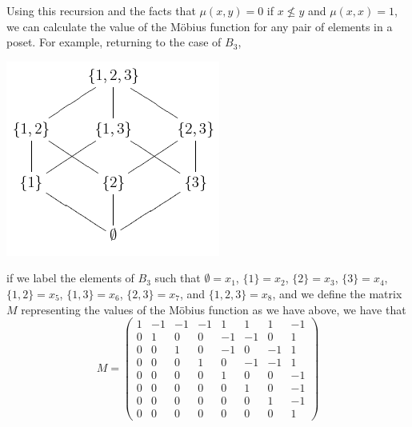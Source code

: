 \documentclass{article} %
\theoremstyle{definition}
\theoremstyle{plain}
\begin{document}
Using this recursion and the facts that $\mu(x,y)=0$ if $x \not\leq y$ and $\mu(x,x)=1$, we can calculate the value of the M\"{o}bius function for any pair of elements in a poset. For example, returning to the case of $B_3$,
%
%
\begin{center}
\includegraphics[scale=.75]{HasseDiagramB_3.png}
\end{center}
if we label the elements of $B_3$ such that $\emptyset=x_1$, $\{1\}=x_2$, $\{2\}=x_3$, $\{3\}=x_4$, $\{1,2\}=x_5$, $\{1,3\}=x_6$, $\{2,3\}=x_7$, and $\{1,2,3\}=x_8$, and we define the matrix $M$ representing the values of the M\"{o}bius function as we have above, we have that
\begin{displaymath}
M=
\left(\begin{array}{rCCCCCCCCl}
1&-1&-1&-1&1&1&1&-1\\
0&1&0&0&-1&-1&0&1\\
0&0&1&0&-1&0&-1&1\\
0&0&0&1&0&-1&-1&1\\
0&0&0&0&1&0&0&-1\\
0&0&0&0&0&1&0&-1\\
0&0&0&0&0&0&1&-1\\
0&0&0&0&0&0&0&1
\end{array}\right)
\end{displaymath}
\end{document}
